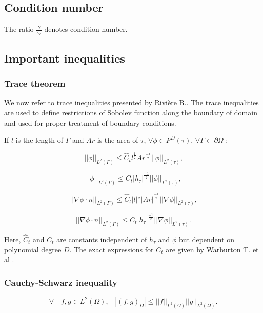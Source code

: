 \documentclass[a4paper,twoside,openright]{book}
\begin{document}
\begin{appendices}
\subsection{Condition number}

The ratio $\frac{\gamma}{\kappa_e}$ denotes condition number.

\subsection{Important inequalities}

\subsubsection{Trace theorem} 

We now refer to trace inequalities presented by Rivi\`ere B.\cite{riviere}. The trace inequalities are used to define restrictions of Sobolev function along the boundary of domain and used for proper treatment of boundary conditions. 

If $l$ is the length of $\Gamma$ and $Ar$ is the area of $\tau$,  $\forall \phi \in P^D (\tau)$, $\forall \Gamma \subset \partial \Omega$ :

\begin{equation}
||\phi||_{L^2(\Gamma)} \leq \hat{C}_t l^{\frac{1}{2}} Ar^{\frac{-1}{2}} ||\phi||_{L^2(\tau)} \textrm{,}
\end{equation}

\begin{equation}
||\phi||_{L^2(\Gamma)} \leq {C}_t |h_\tau|^{\frac{-1}{2}} ||\phi||_{L^2(\tau)} \textrm{,}
\end{equation}

\begin{equation}
||\nabla \phi \cdot n||_{L^2(\Gamma)} \leq \hat{C}_t |l|^{\frac{1}{2}} |Ar|^{\frac{-1}{2}} ||\nabla \phi||_{L^2(\tau)} \textrm{,}
\end{equation}

\begin{equation}
||\nabla \phi \cdot n||_{L^2(\Gamma)} \leq {C}_t |h_\tau|^{\frac{-1}{2}} ||\nabla \phi||_{L^2(\tau)} \textrm{.}
\end{equation}

Here, $\hat{C}_t$ and ${C}_t$ are constants independent of $h_\tau$ and $\phi$ but dependent on polynomial degree $D$. The exact expressions for $C_t$ are given by Warburton T. et al \cite{warburton}.

\subsubsection{Cauchy-Schwarz inequality} 
\begin{equation}
\forall \quad f,g \in L^2(\Omega) \textrm{,} \quad |(f,g)_{\Omega}| \leq ||f||_{L^2(\Omega)} ||g||_{L^2(\Omega)} \textrm{.}
\end{equation}


\end{appendices}
\end{document}
